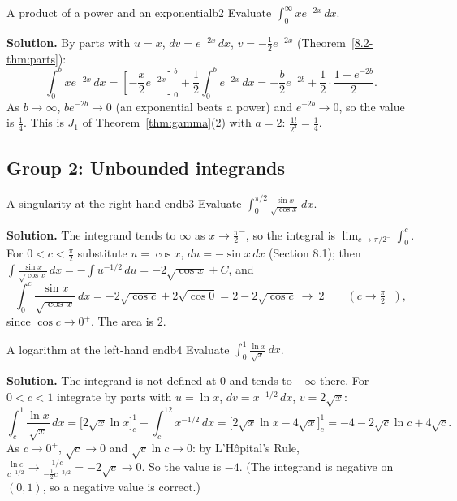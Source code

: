 \documentclass[11pt]{article}
\begin{document}
\begin{exmp}{A product of a power and an exponential}{b2}
Evaluate $\displaystyle\int_0^\infty xe^{-2x}\,dx$.

\textbf{Solution.} By parts with $u=x$, $dv=e^{-2x}\,dx$, $v=-\frac12e^{-2x}$ (Theorem~\ref{8.2-thm:parts}):
\[\int_0^bxe^{-2x}\,dx=\left[-\frac x2e^{-2x}\right]_0^b+\frac12\int_0^be^{-2x}\,dx=-\frac b2e^{-2b}+\frac12\cdot\frac{1-e^{-2b}}2 .\]
As $b\to\infty$, $be^{-2b}\to0$ (an exponential beats a power) and $e^{-2b}\to0$, so the value is $\frac14$. This is $J_1$ of Theorem~\ref{thm:gamma}(2) with $a=2$: $\frac{1!}{2^2}=\frac14$.
\end{exmp}

\subsection*{Group 2: Unbounded integrands}

\begin{exmp}{A singularity at the right-hand end}{b3}
Evaluate $\displaystyle\int_0^{\pi/2}\frac{\sin x}{\sqrt{\cos x}}\,dx$.

\textbf{Solution.} The integrand tends to $\infty$ as $x\to\frac\pi2^-$, so the integral is $\lim_{c\to\pi/2^-}\int_0^c$. For $0<c<\frac\pi2$ substitute $u=\cos x$, $du=-\sin x\,dx$ (Section 8.1); then $\int\frac{\sin x}{\sqrt{\cos x}}\,dx=-\int u^{-1/2}\,du=-2\sqrt{\cos x}+C$, and
\[\int_0^c\frac{\sin x}{\sqrt{\cos x}}\,dx=-2\sqrt{\cos c}+2\sqrt{\cos0}=2-2\sqrt{\cos c}\ \longrightarrow\ 2\qquad(c\to\tfrac\pi2^-),\]
since $\cos c\to0^+$. The area is $2$.
\end{exmp}

\begin{exmp}{A logarithm at the left-hand end}{b4}
Evaluate $\displaystyle\int_0^1\frac{\ln x}{\sqrt x}\,dx$.

\textbf{Solution.} The integrand is not defined at $0$ and tends to $-\infty$ there. For $0<c<1$ integrate by parts with $u=\ln x$, $dv=x^{-1/2}\,dx$, $v=2\sqrt x$:
\[\int_c^1\frac{\ln x}{\sqrt x}\,dx=\Big[2\sqrt x\ln x\Big]_c^1-\int_c^12x^{-1/2}\,dx=\Big[2\sqrt x\ln x-4\sqrt x\Big]_c^1=-4-2\sqrt c\ln c+4\sqrt c .\]
As $c\to0^+$, $\sqrt c\to0$ and $\sqrt c\ln c\to0$: by L'Hôpital's Rule, $\frac{\ln c}{c^{-1/2}}\to\frac{1/c}{-\frac12c^{-3/2}}=-2\sqrt c\to0$. So the value is $-4$.
(The integrand is negative on $(0,1)$, so a negative value is correct.)
\end{exmp}
\end{document}
